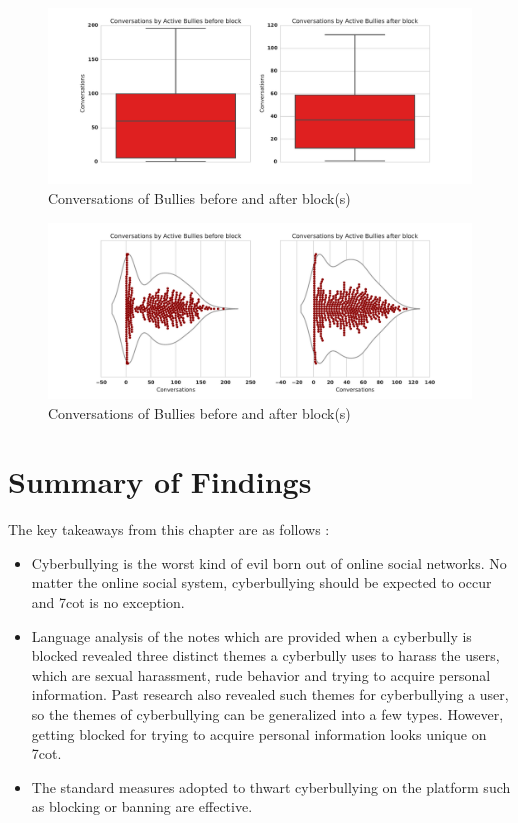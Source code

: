 \begin{figure}
	\centering %
	\includegraphics[width=5in]{B1.pdf} %
	\caption{Conversations of Bullies before and after block(s)} 
	\label{fig:4}
\end{figure}

\begin{figure}
	\centering %
	\includegraphics[width=5in]{v1.pdf} %
	\caption{Conversations of Bullies before and after block(s)} 
	\label{fig:5}
\end{figure}

\section{Summary of Findings}
The key takeaways from this chapter are as follows :
\begin{itemize}
\item Cyberbullying is the worst kind of evil born out of online social networks. No matter the online social system, cyberbullying should be expected to occur and 7cot is no exception.
\item Language analysis of the notes which are provided when a cyberbully is blocked revealed three distinct themes a cyberbully uses to harass the users, which are sexual harassment, rude behavior and trying to acquire personal information. Past research also revealed such themes for cyberbullying a user, so the themes of cyberbullying can be generalized into a few types. However, getting blocked for trying to acquire personal information looks unique on 7cot.
\item The standard measures adopted to thwart cyberbullying on the platform such as blocking or banning are effective. 
\end{itemize}
